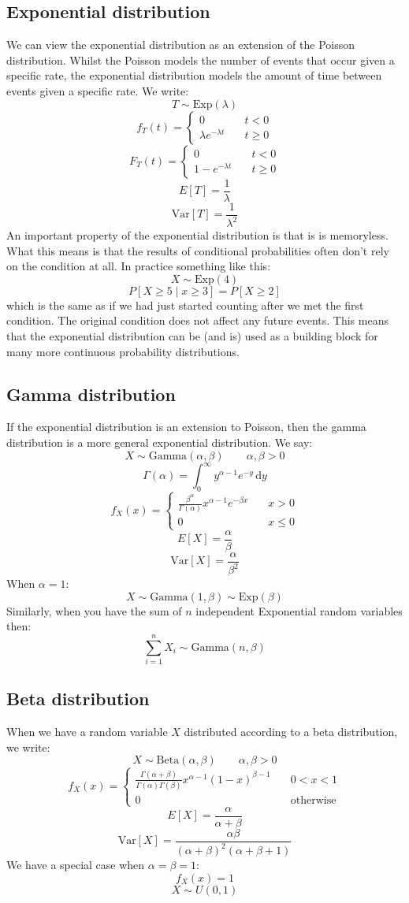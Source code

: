 \documentclass[12pt]{article}
\newcommand{\Var}[1]{\text{Var}[#1]}
\begin{document}
\subsection*{Exponential distribution}
We can view the exponential distribution as an extension of the Poisson distribution. Whilst the Poisson models the number of events that occur given a specific rate, the exponential distribution models the amount of time between events given a specific rate. We write:
\[T\sim\text{Exp}(\lambda)\]
\[f_T(t)=\begin{cases}
    0&\quad t<0\\
    \lambda e^{-\lambda t}& \quad t\geq 0
\end{cases}\]
\[F_T(t)=\begin{cases}
    0&\quad t<0\\
    1-e^{-\lambda t}&\quad t\geq0
\end{cases}\]
\[E[T]=\frac{1}{\lambda}\]
\[\Var{T}=\frac{1}{\lambda^2}\]
An important property of the exponential distribution is that is is memoryless. What this means is that the results of conditional probabilities often don't rely on the condition at all. In practice something like this:
\[X\sim\text{Exp}(4)\]
\[P[X\geq 5 \mid x\geq3]=P[X\geq2]\]
which is the same as if we had just started counting after we met the first condition. The original condition does not affect any future events. This means that the exponential distribution can be (and is) used as a building block for many more continuous probability distributions.
\subsection*{Gamma distribution}
If the exponential distribution is an extension to Poisson, then the gamma distribution is a more general exponential distribution. We say:
\[X\sim\text{Gamma}(\alpha,\beta)\qquad \alpha,\beta>0\]
\[\Gamma(\alpha)=\int_0^\infty y^{\alpha-1}e^{-y}\,\text{d}y\]
\[f_X(x)=\begin{cases}
    \frac{\beta^\alpha}{\Gamma(\alpha)}x^{\alpha-1}e^{-\beta x}&\quad x>0 \\
    0&\quad x\leq 0
\end{cases}\]
\[E[X]=\frac{\alpha}{\beta}\]
\[\Var{X}=\frac{\alpha}{\beta^2}\]
When \(\alpha=1\):
\[X\sim\text{Gamma}(1,\beta)\sim\text{Exp}(\beta)\]
Similarly, when you have the sum of \(n\) independent Exponential random variables then:
\[\sum_{i=1}^nX_i\sim\text{Gamma}(n,\beta)\]
\subsection*{Beta distribution}
When we have a random variable \(X\) distributed according to a beta distribution, we write:
\[X\sim\text{Beta}(\alpha,\beta)\qquad\alpha,\beta>0\]
\[f_X(x)=\begin{cases}
    \frac{\Gamma(\alpha+\beta)}{\Gamma(\alpha)\Gamma(\beta)}x^{\alpha-1}(1-x)^{\beta-1}&\quad0<x<1 \\
    0&\quad \text{otherwise}
\end{cases}\]
\[E[X]=\frac{\alpha}{\alpha+\beta}\]
\[\Var{X}=\frac{\alpha\beta}{(\alpha+\beta)^2(\alpha+\beta+1)}\]
We have a special case when \(\alpha=\beta=1\):
\[f_X(x)=1\]
\[X\sim U(0,1)\]
\end{document}
